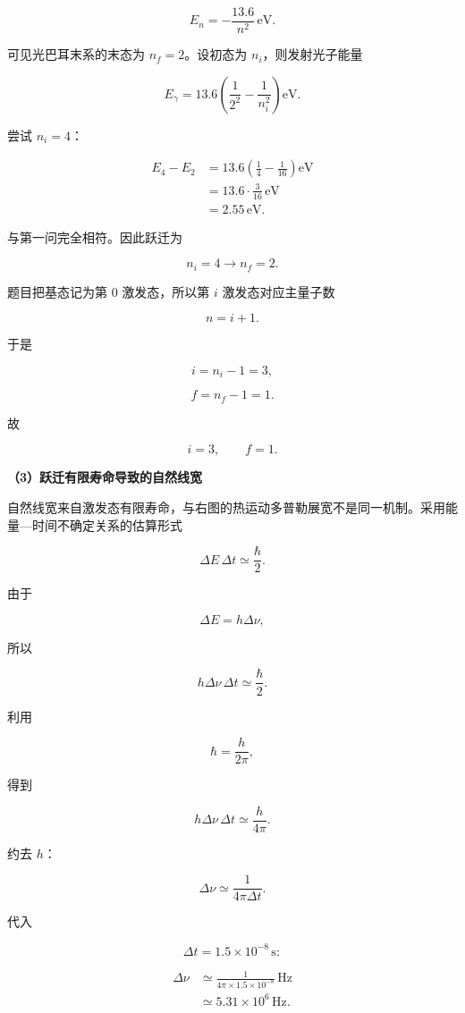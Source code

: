 \documentclass[12pt,a4paper,UTF8]{ctexart}
\begin{document}
\[
E_n=-\frac{13.6}{n^2}\,\mathrm{eV}.
\]

可见光巴耳末系的末态为 \(n_f=2\)。设初态为 \(n_i\)，则发射光子能量

\[
E_\gamma=13.6\left(\frac1{2^2}-\frac1{n_i^2}\right)\mathrm{eV}.
\]

尝试 \(n_i=4\)：

\[
\begin{aligned}
E_4-E_2
&=13.6\left(\frac14-\frac1{16}\right)\mathrm{eV}\\
&=13.6\cdot\frac3{16}\,\mathrm{eV}\\
&=2.55\,\mathrm{eV}.
\end{aligned}
\]

与第一问完全相符。因此跃迁为

\[
\boxed{n_i=4\to n_f=2}.
\]

题目把基态记为第 \(0\) 激发态，所以第 \(i\) 激发态对应主量子数

\[n=i+1.\]

于是

\[i=n_i-1=3,\]

\[f=n_f-1=1.\]

故

\[
\boxed{i=3,\qquad f=1}.
\]

\textbf{（3）跃迁有限寿命导致的自然线宽}

自然线宽来自激发态有限寿命，与右图的热运动多普勒展宽不是同一机制。采用能量---时间不确定关系的估算形式

\[
\Delta E\,\Delta t\simeq\frac{\hbar}{2}.
\]

由于

\[
\Delta E=h\Delta\nu,
\]

所以

\[
h\Delta\nu\,\Delta t\simeq\frac{\hbar}{2}.
\]

利用

\[\hbar=\frac{h}{2\pi},\]

得到

\[
h\Delta\nu\,\Delta t\simeq\frac{h}{4\pi}.
\]

约去 \(h\)：

\[
\Delta\nu\simeq\frac{1}{4\pi\Delta t}.
\]

代入

\[\Delta t=1.5\times10^{-8}\,\mathrm{s}:\]

\[
\begin{aligned}
\Delta\nu
&\simeq\frac{1}{4\pi\times1.5\times10^{-8}}\,\mathrm{Hz}\\
&\simeq5.31\times10^6\,\mathrm{Hz}.
\end{aligned}
\]
\end{document}
